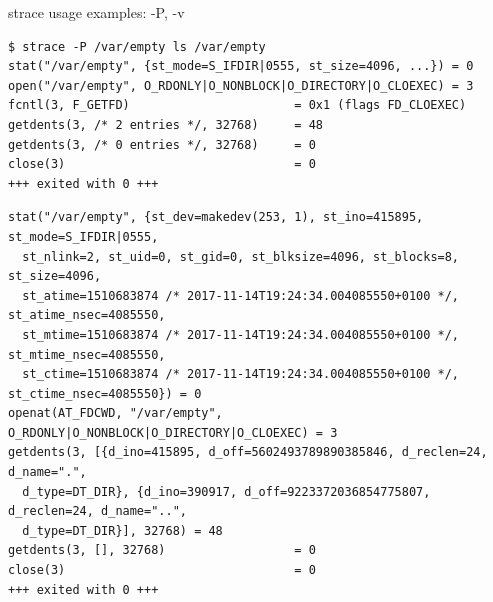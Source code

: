 \documentclass[unicode,aspectratio=169]{beamer}
\begin{document}
\begin{frame}[fragile]{strace usage examples: -P, -v}
\scriptsize
\begin{verbatim}
$ strace -P /var/empty ls /var/empty
stat("/var/empty", {st_mode=S_IFDIR|0555, st_size=4096, ...}) = 0
open("/var/empty", O_RDONLY|O_NONBLOCK|O_DIRECTORY|O_CLOEXEC) = 3
fcntl(3, F_GETFD)                       = 0x1 (flags FD_CLOEXEC)
getdents(3, /* 2 entries */, 32768)     = 48
getdents(3, /* 0 entries */, 32768)     = 0
close(3)                                = 0
+++ exited with 0 +++
\end{verbatim}

\begin{verbatim}
stat("/var/empty", {st_dev=makedev(253, 1), st_ino=415895, st_mode=S_IFDIR|0555,
  st_nlink=2, st_uid=0, st_gid=0, st_blksize=4096, st_blocks=8, st_size=4096,
  st_atime=1510683874 /* 2017-11-14T19:24:34.004085550+0100 */, st_atime_nsec=4085550,
  st_mtime=1510683874 /* 2017-11-14T19:24:34.004085550+0100 */, st_mtime_nsec=4085550,
  st_ctime=1510683874 /* 2017-11-14T19:24:34.004085550+0100 */, st_ctime_nsec=4085550}) = 0
openat(AT_FDCWD, "/var/empty", O_RDONLY|O_NONBLOCK|O_DIRECTORY|O_CLOEXEC) = 3
getdents(3, [{d_ino=415895, d_off=5602493789890385846, d_reclen=24, d_name=".",
  d_type=DT_DIR}, {d_ino=390917, d_off=9223372036854775807, d_reclen=24, d_name="..",
  d_type=DT_DIR}], 32768) = 48
getdents(3, [], 32768)                  = 0
close(3)                                = 0
+++ exited with 0 +++
\end{verbatim}
\end{frame}
\end{document}

